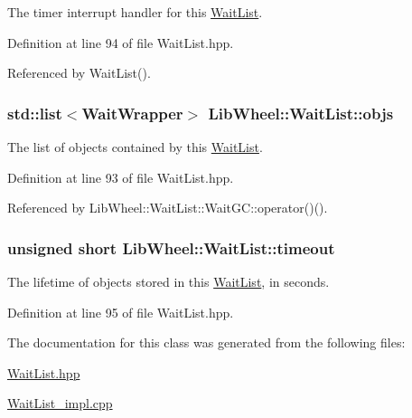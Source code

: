 \-The timer interrupt handler for this \hyperlink{classLibWheel_1_1WaitList}{\-Wait\-List}. 



\-Definition at line 94 of file \-Wait\-List.\-hpp.



\-Referenced by \-Wait\-List().

\hypertarget{classLibWheel_1_1WaitList_a33add3411131d6588693cb4d382f678e}{
\subsubsection[{objs}]{\setlength{\rightskip}{0pt plus 5cm}std\-::list$<${\bf \-Wait\-Wrapper}$>$ {\bf \-Lib\-Wheel\-::\-Wait\-List\-::objs}}}
\label{classLibWheel_1_1WaitList_a33add3411131d6588693cb4d382f678e}


\-The list of objects contained by this \hyperlink{classLibWheel_1_1WaitList}{\-Wait\-List}. 



\-Definition at line 93 of file \-Wait\-List.\-hpp.



\-Referenced by \-Lib\-Wheel\-::\-Wait\-List\-::\-Wait\-G\-C\-::operator()().

\hypertarget{classLibWheel_1_1WaitList_a53c2d486c7c8a16a7c25176a974b9759}{
\subsubsection[{timeout}]{\setlength{\rightskip}{0pt plus 5cm}unsigned short {\bf \-Lib\-Wheel\-::\-Wait\-List\-::timeout}}}
\label{classLibWheel_1_1WaitList_a53c2d486c7c8a16a7c25176a974b9759}


\-The lifetime of objects stored in this \hyperlink{classLibWheel_1_1WaitList}{\-Wait\-List}, in seconds. 



\-Definition at line 95 of file \-Wait\-List.\-hpp.



\-The documentation for this class was generated from the following files\-:\begin{DoxyCompactItemize}
\item 
\hyperlink{WaitList_8hpp}{\-Wait\-List.\-hpp}\item 
\hyperlink{WaitList__impl_8cpp}{\-Wait\-List\-\_\-impl.\-cpp}\end{DoxyCompactItemize}
